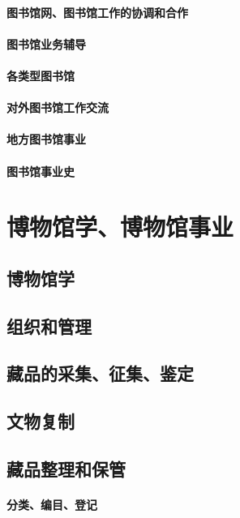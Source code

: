 \documentclass[UTF8]{../../ApplicationUniverse}
\begin{document}
    \subsubsection{图书馆网、图书馆工作的协调和合作}
    \subsubsection{图书馆业务辅导}
    \subsubsection{各类型图书馆}
    \subsubsection{对外图书馆工作交流}
    \subsubsection{地方图书馆事业}
    \subsubsection{图书馆事业史}










\chapter{博物馆学、博物馆事业}
\section{博物馆学}
\section{组织和管理}
\section{藏品的采集、征集、鉴定}
\section{文物复制}
\section{藏品整理和保管}
    \subsubsection{分类、编目、登记}
\end{document}
